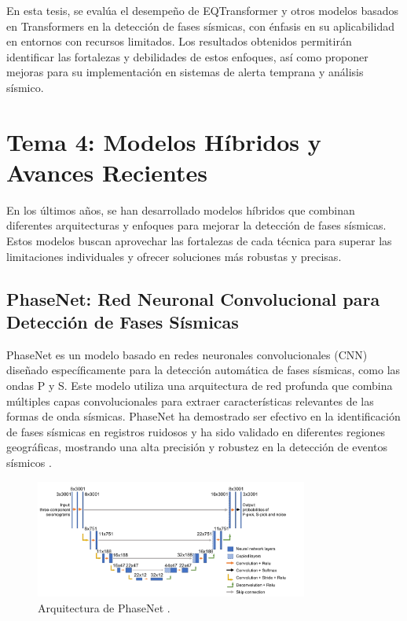 En esta tesis, se evalúa el desempeño de EQTransformer y otros modelos basados en Transformers en la detección de fases sísmicas, con énfasis en su aplicabilidad en entornos con recursos limitados. Los resultados obtenidos permitirán identificar las fortalezas y debilidades de estos enfoques, así como proponer mejoras para su implementación en sistemas de alerta temprana y análisis sísmico.

\section{Tema 4: Modelos Híbridos y Avances Recientes}
En los últimos años, se han desarrollado modelos híbridos que combinan diferentes arquitecturas y enfoques para mejorar la detección de fases sísmicas. Estos modelos buscan aprovechar las fortalezas de cada técnica para superar las limitaciones individuales y ofrecer soluciones más robustas y precisas.

\subsection{PhaseNet: Red Neuronal Convolucional para Detección de Fases Sísmicas}
PhaseNet es un modelo basado en redes neuronales convolucionales (CNN) diseñado específicamente para la detección automática de fases sísmicas, como las ondas P y S. Este modelo utiliza una arquitectura de red profunda que combina múltiples capas convolucionales para extraer características relevantes de las formas de onda sísmicas. PhaseNet ha demostrado ser efectivo en la identificación de fases sísmicas en registros ruidosos y ha sido validado en diferentes regiones geográficas, mostrando una alta precisión y robustez en la detección de eventos sísmicos \cite{10.1093/gji/ggy423}.

\begin{figure}[htbp]
    \centering
    \includegraphics[width=0.8\textwidth]{figures/POHASENET.png}
    \caption{Arquitectura de PhaseNet \cite{10.1093/gji/ggy423}.}
    \label{fig:phasenet_architecture}
\end{figure}


